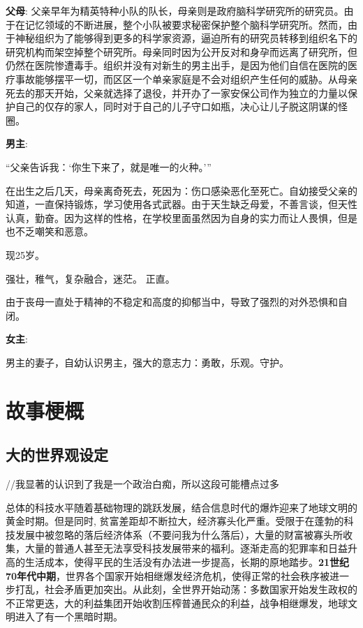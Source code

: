 \documentclass[12pt, a4paper]{article}
\begin{document}
        \textbf{父母}:
            父亲早年为精英特种小队的队长，母亲则是政府脑科学研究所的研究员。由于在记忆领域的不断进展，整个小队被要求秘密保护整个脑科学研究所。然而，由于神秘组织为了能够得到更多的科学家资源，逼迫所有的研究员转移到组织名下的研究机构而架空掉整个研究所。母亲同时因为公开反对和身孕而远离了研究所，但仍然在医院惨遭毒手。组织并没有对新生的男主出手，是因为他们自信在医院的医疗事故能够摆平一切，而区区一个单亲家庭是不会对组织产生任何的威胁。从母亲死去的那天开始，父亲就选择了退役，并开办了一家安保公司作为独立的力量以保护自己的仅存的家人，同时对于自己的儿子守口如瓶，决心让儿子脱这阴谋的怪圈。

        \textbf{男主}:

            “父亲告诉我：‘你生下来了，就是唯一的火种。’” 
            
            在出生之后几天，母亲离奇死去，死因为：伤口感染恶化至死亡。自幼接受父亲的知道，一直保持锻炼，学习使用各式武器。由于天生缺乏母爱，不善言谈，但天性认真，勤奋。因为这样的性格，在学校里面虽然因为自身的实力而让人畏惧，但是也不乏嘲笑和恶意。
            


            现25岁。

            强壮，稚气，复杂融合，迷茫。 正直。

            由于丧母一直处于精神的不稳定和高度的抑郁当中，导致了强烈的对外恐惧和自闭。

        \medskip
        \textbf{女主}:  


            男主的妻子，自幼认识男主，强大的意志力：勇敢，乐观。守护。 
            
    \newpage 

    \section*{故事梗概}

    \subsection*{大的世界观设定}    

    //我显著的认识到了我是一个政治白痴，所以这段可能槽点过多
    
    总体的科技水平随着基础物理的跳跃发展，结合信息时代的爆炸迎来了地球文明的黄金时期。但是同时, 贫富差距却不断拉大，经济寡头化严重。受限于在蓬勃的科技发展中被忽略的落后经济体系（不要问我为什么落后），大量的财富被寡头所收集，大量的普通人甚至无法享受科技发展带来的福利。逐渐走高的犯罪率和日益升高的生活成本，使得平民的生活没有办法进一步提高，长期的原地踏步。\textbf{21世纪70年代中期}，世界各个国家开始相继爆发经济危机，使得正常的社会秩序被进一步打乱，社会矛盾更加突出。从此刻，全世界开始动荡：多数国家开始发生政权的不正常更迭，大的利益集团开始收割压榨普通民众的利益，战争相继爆发，地球文明进入了有一个黑暗时期。
\end{document}
